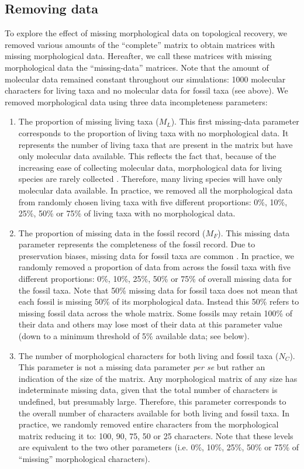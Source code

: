 \subsection{Removing data}
To explore the effect of missing morphological data on topological recovery, we removed various amounts of the ``complete'' matrix to obtain matrices with missing morphological data.
Hereafter, we call these matrices with missing morphological data the ``missing-data'' matrices.
Note that the amount of molecular data remained constant throughout our simulations: 1000 molecular characters for living taxa and no molecular data for fossil taxa (see above).
We removed morphological data using three data incompleteness parameters:
\begin{enumerate}
\item{The proportion of missing living taxa ($M_L$).}
This first missing-data parameter corresponds to the proportion of living taxa with no morphological data. It represents the number of living taxa that are present in the matrix but have only molecular data available. This reflects the fact that, because of the increasing ease of collecting molecular data, morphological data for living species are rarely collected \citep{GuillermeCooperMissing}.
Therefore, many living species will have only molecular data available.
In practice, we removed all the morphological data from randomly chosen living taxa with five different proportions: 0\%, 10\%, 25\%, 50\% or 75\% of living taxa with no morphological data.
\item{The proportion of missing data in the fossil record ($M_F$).}
This missing data parameter represents the completeness of the fossil record.
Due to preservation biases, missing data for fossil taxa are common \citep{sansomfossilization2013}.
In practice, we randomly removed a proportion of data from across the fossil taxa with five different proportions: 0\%, 10\%, 25\%, 50\% or 75\% of overall missing data for the fossil taxa.
Note that 50\% missing data for fossil taxa does not mean that each fossil is missing 50\% of its morphological data.
Instead this 50\% refers to missing fossil data across the whole matrix.
Some fossils may retain 100\% of their data and others may lose most of their data at this parameter value (down to a minimum threshold of 5\% available data; see below).
\item{The number of morphological characters for both living and fossil taxa ($N_C$).}
This parameter is not a missing data parameter \textit{per se} but rather an indication of the size of the matrix.
Any morphological matrix of any size has indeterminate missing data, given that the total number of characters is undefined, but presumably large.
Therefore, this parameter corresponds to the overall number of characters available for both living and fossil taxa.
In practice, we randomly removed entire characters from the morphological matrix reducing it to: 100, 90, 75, 50 or 25 characters.
Note that these levels are equivalent to the two other parameters (i.e. 0\%, 10\%, 25\%, 50\% or 75\% of ``missing'' morphological characters).
\end{enumerate}

